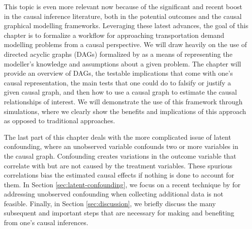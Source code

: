 This topic is even more relevant now because of the significant and recent boost in the causal inference literature, both in the potential outcomes and the causal graphical modelling frameworks.
Leveraging these latest advances, the goal of this chapter is to formalize a workflow for approaching
transportation demand modelling problems from a causal perspective.
We will draw heavily on the use of directed acyclic graphs (DAGs) formalized by \citet{pearl_causality_2000} as a means of representing the modeller's knowledge and assumptions about a given problem.
The chapter will provide an overview of DAGs, the
testable implications that come with one's causal representation, the main
tests that one could do to falsify or justify a given causal graph, and then how
to use a causal graph to estimate the causal relationships of interest.
We will demonstrate the use of this framework through simulations, where we
clearly show the benefits and implications of this approach as opposed to
traditional approaches.

The last part of this chapter deals with the more complicated issue of latent
confounding, where an unobserved variable confounds two or more variables in the causal graph.
Confounding creates variations in the outcome variable that correlate with but are not caused by the treatment variables.
These spurious correlations bias the estimated causal effects if nothing is done to account for them.
In Section \ref{sec:latent-confounding}, we focus on a recent technique by \citet{wang_2019_blessings} for addressing unobserved confounding when collecting additional data is not feasible.
Finally, in Section \ref{sec:discussion}, we briefly discuss the many subsequent and important steps that are necessary for making and benefiting from one's causal inferences.
